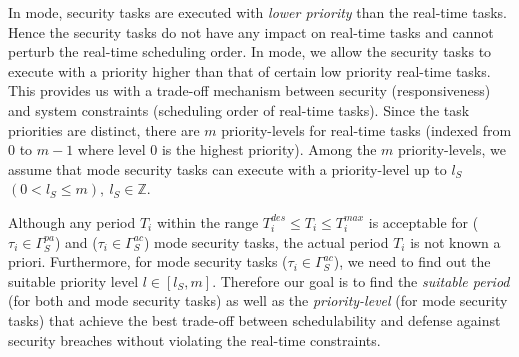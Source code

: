 \documentclass[../rt_server_main.tex]{subfiles}
\begin{document}
 
In \pve mode, security tasks are executed with \textit{lower priority} than the real-time tasks. Hence the security tasks do not have any impact on real-time tasks and cannot perturb the real-time scheduling order. In \ave mode, we allow the security tasks to execute with a priority higher than that of certain low priority real-time tasks. This provides us with a trade-off mechanism between security (\eg responsiveness) and system constraints (\eg scheduling order of real-time tasks). Since the task priorities are distinct, there are $m$ priority-levels for real-time tasks (indexed from $0$ to $m-1$ where level $0$ is the highest priority). Among the $m$ priority-levels, we assume that \ave mode security tasks can execute with a priority-level up to $l_S$ $(0 < l_S \leq m),~ l_S \in \mathbb{Z}$. %

Although any period $T_i$ within the range $T_i^{des} \leq T_i \leq T_i^{max}$ is acceptable for \pve (\eg $\tau_i \in \Gamma_S^{pa}$) and \ave (\eg $\tau_i \in \Gamma_S^{ac}$) mode  security tasks, the actual period $T_i$ is not known a priori. Furthermore, for \ave mode security tasks (\eg $\tau_i \in \Gamma_S^{ac}$), we need to find out the suitable priority level $l \in [l_S, m]$. Therefore our goal is to find the \textit{suitable period} (for both \pve and \ave mode security tasks) as well as the \textit{priority-level} (for \ave mode security tasks) that achieve the best trade-off between schedulability and defense against security breaches without violating the real-time constraints.

 
\end{document}
